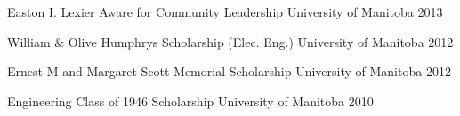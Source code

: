 \begin{cvhonors}

  \cvhonor
	{Easton I. Lexier Aware for Community Leadership} %
	{University of Manitoba} %
	{} %
	{2013} %

  \cvhonor
	{William \& Olive Humphrys Scholarship (Elec. Eng.)} %
	{University of Manitoba} %
	{} %
	{2012} %

  \cvhonor
	{Ernest M and Margaret Scott Memorial Scholarship} %
	{University of Manitoba} %
	{} %
	{2012} %

  \cvhonor
	{Engineering Class of 1946 Scholarship} %
	{University of Manitoba} %
	{} %
	{2010} %

\end{cvhonors}



